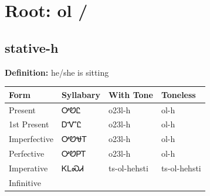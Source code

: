 \documentclass{article}%
\begin{document}
%
\normalsize%
\section*{Root: ol / }%
\subsection*{stative-h}%
\textbf{Definition: }%
he/she is sitting%
\\[0.5em]%
\begin{tabular}{|l|l|l|l|}%
\hline%
\textbf{Form}&\textbf{Syllabary}&\textbf{With Tone}&\textbf{Toneless}\\%
\hline%
Present&ᎤᏬᏝ&o23l{-}h&ol{-}h\\%
1st Present&ᎠᏉᏝ&o23l{-}h&ol{-}h\\%
Imperfective&ᎤᏬᏠᎢ&o23l{-}h&ol{-}h\\%
Perfective&ᎤᏬᏢᎢ&o23l{-}h&ol{-}h\\%
Imperative&ᏦᏞᏍᏗ&ts{-}ol{-}hehsti&ts{-}ol{-}hehsti\\%
Infinitive&&&\\%
\hline%
\end{tabular}%
\\[1em]%
\end{document}

